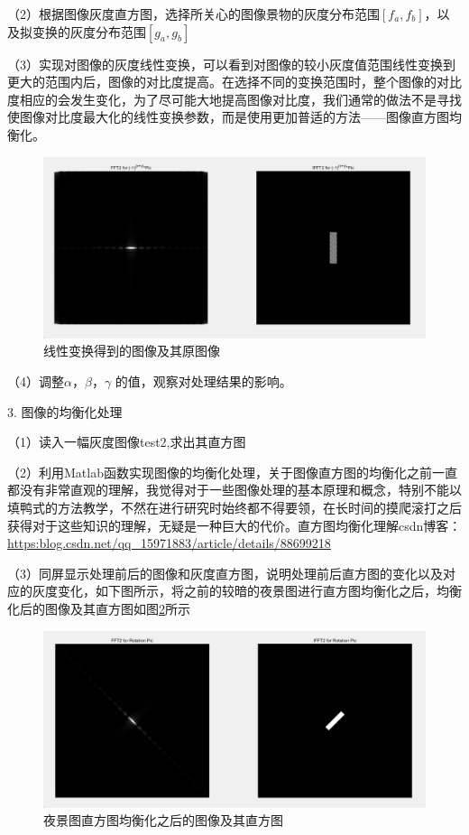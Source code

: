 \documentclass[UTF8]{article} %
\begin{document}
	（2）根据图像灰度直方图，选择所关心的图像景物的灰度分布范围$[f_{a},f_{b}]$，以及拟变换的灰度分布范围$[g_{a},g_{b}]$
	
	（3）实现对图像的灰度线性变换，可以看到对图像的较小灰度值范围线性变换到更大的范围内后，图像的对比度提高。在选择不同的变换范围时，整个图像的对比度相应的会发生变化，为了尽可能大地提高图像对比度，我们通常的做法不是寻找使图像对比度最大化的线性变换参数，而是使用更加普适的方法——图像直方图均衡化。
	\begin{figure}[H]
		\centering
		\includegraphics[width=0.7\linewidth]{screenshot002}
		\caption{线性变换得到的图像及其原图像}
		\label{fig:1-1}
	\end{figure}
	
	（4）调整$\alpha$，$\beta$，$\gamma$ 的值，观察对处理结果的影响。
	
	3. 图像的均衡化处理
	
	（1）读入一幅灰度图像test2,求出其直方图
	
	（2）利用Matlab函数实现图像的均衡化处理，关于图像直方图的均衡化之前一直都没有非常直观的理解，我觉得对于一些图像处理的基本原理和概念，特别不能以填鸭式的方法教学，不然在进行研究时始终都不得要领，在长时间的摸爬滚打之后获得对于这些知识的理解，无疑是一种巨大的代价。直方图均衡化理解csdn博客：\url{https:blog.csdn.net/qq_15971883/article/details/88699218}
	
	（3）同屏显示处理前后的图像和灰度直方图，说明处理前后直方图的变化以及对应的灰度变化，如下图所示，将之前的较暗的夜景图进行直方图均衡化之后，均衡化后的图像及其直方图如图\ref{fig:1-2}所示
	\begin{figure}[H]
		\centering
		\includegraphics[width=0.5\linewidth]{screenshot003}
		\caption{夜景图直方图均衡化之后的图像及其直方图}
		\label{fig:1-2}
	\end{figure}
\end{document}
